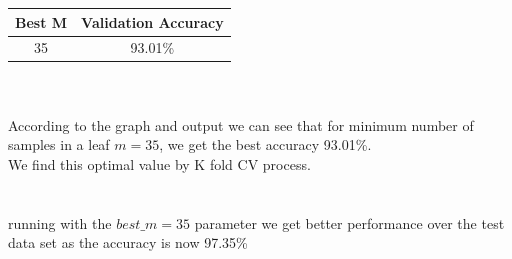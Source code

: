\documentclass[12pt]{article}
\begin{document}
\begin{center}
\begin{tabular}{ ||c|c|| } 
 \hline
Best M  & Validation Accuracy \\ 
 \hline
 35 & 93.01\% \\ 
 \hline
\end{tabular}
\end{center}
\\
\\
According to the graph and output we can see that for minimum number of samples in a leaf $m=35$, we get the best accuracy 93.01\%.\\
We find this optimal value by K fold CV process.\\
\\
\\
running with the  $best\_m=35$ parameter we get better performance over the test data set as the accuracy is now 97.35\%
\end{document}
